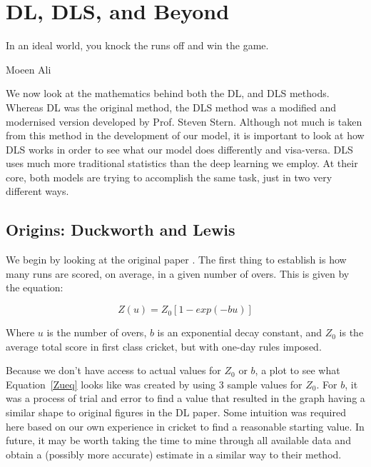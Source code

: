 \chapter{DL, DLS, and Beyond}

\epigraph{In an ideal world, you knock the runs off and win the game.}{Moeen Ali}

We now look at the mathematics behind both the DL, and DLS methods. Whereas DL was the original
method, the DLS method was a modified and modernised version developed by Prof. Steven Stern. Although not much is taken from this method 
in the development of our model, it is important to look at how DLS works in order to see what our model does differently 
and visa-versa. DLS uses much more traditional statistics than the deep learning we employ. At their core, both models are trying to accomplish 
the same task, just in two very different ways.

\section{Origins: Duckworth and Lewis}
We begin by looking at the original paper \cite{duckworth}. The first thing to establish is how many runs are scored,
on average, in a given number of overs. This is given by the equation:

\begin{equation}
    Z(u) = Z_0[1-exp(-bu)]
    \label{Zueq}  
\end{equation}

Where $u$ is the number of overs, $b$ is an exponential decay constant, and $Z_0$ is the
average total score in first class cricket, but with one-day rules imposed.  

Because we don't have access to actual values for $Z_0$ or $b$, a plot to see what Equation~\ref{Zueq} looks 
like was created by using 3 sample values for $Z_0$. For $b$, it was a process of trial and error to find a value
that resulted in the graph having a similar shape to original figures in the DL paper. Some intuition was required here 
based on our own experience in cricket to find a reasonable starting value. In future, it may be worth taking the time to 
mine through all available data and obtain a (possibly more accurate) estimate in a similar way to their method. 

